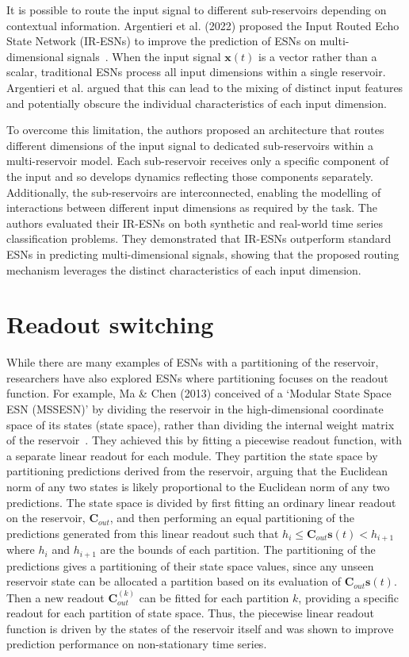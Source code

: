 It is possible to route the input signal to different sub-reservoirs depending on contextual information. Argentieri et al. (2022) proposed the Input Routed Echo State Network (IR-ESNs) to improve the prediction of ESNs on multi-dimensional signals~\cite{argentieri_2022}. When the input signal $\mathbf{x}(t)$ is a vector rather than a scalar, traditional ESNs process all input dimensions within a single reservoir. Argentieri et al. argued that this can lead to the mixing of distinct input features and potentially obscure the individual characteristics of each input dimension.

To overcome this limitation, the authors proposed an architecture that routes different dimensions of the input signal to dedicated sub-reservoirs within a multi-reservoir model. Each sub-reservoir receives only a specific component of the input and so develops dynamics reflecting those components separately. Additionally, the sub-reservoirs are interconnected, enabling the modelling of interactions between different input dimensions as required by the task. The authors evaluated their IR-ESNs on both synthetic and real-world time series classification problems. They demonstrated that IR-ESNs outperform standard ESNs in predicting multi-dimensional signals, showing that the proposed routing mechanism leverages the distinct characteristics of each input dimension.



\section{Readout switching}

While there are many examples of ESNs with a partitioning of the reservoir, researchers have also explored ESNs where partitioning focuses on the readout function. For example, Ma \& Chen (2013) conceived of a `Modular State Space ESN (MSSESN)' by dividing the reservoir in the high-dimensional coordinate space of its states (state space), rather than dividing the internal weight matrix of the reservoir~\cite{ma_chen_2013}. They achieved this by fitting a piecewise readout function, with a separate linear readout for each module. They partition the state space by partitioning predictions derived from the reservoir, arguing that the Euclidean norm of any two states is likely proportional to the Euclidean norm of any two predictions. The state space is divided by first fitting an ordinary linear readout on the reservoir, $\mathbf{C}_{out}$, and then performing an equal partitioning of the predictions generated from this linear readout such that $h_i \leqslant \mathbf{C}_{out}\mathbf{s}(t) < h_{i+1}$ where $h_i$ and $h_{i+1}$ are the bounds of each partition. The partitioning of the predictions gives a partitioning of their state space values, since any unseen reservoir state can be allocated a partition based on its evaluation of $\mathbf{C}_{out}\mathbf{s}(t)$. Then a new readout $\mathbf{C}_{out}^{(k)}$ can be fitted for each partition $k$, providing a specific readout for each partition of state space. Thus, the piecewise linear readout function is driven by the states of the reservoir itself and was shown to improve prediction performance on non-stationary time series.


